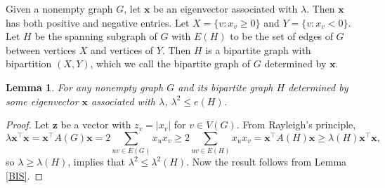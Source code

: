 \documentclass[12pt]{article}
\newtheorem{lemma}{Lemma}[section]
\begin{document}
Given a nonempty graph $G$, let $\mathbf{x}$ be an eigenvector associated with $\lambda$. %
Then $\mathbf{x}$ has both positive and negative entries. Let $X = \{v : x_v \ge 0\}$ and $Y = \{v : x_v < 0\}$. Let $H$ be the spanning subgraph of $G$ with $E(H)$ to be the set of edges of $G$ between vertices $X$ and vertices of $Y$. Then $H$ is a bipartite graph with bipartition $(X, Y)$, which we call the bipartite graph of $G$ determined by $\mathbf{x}$.



\begin{lemma}\label{maxcut}
For any nonempty graph $G$ and its  bipartite graph $H$ determined by some eigenvector  $\mathbf{x}$ associated with $\lambda$, $\lambda^2 \le e(H)$.
\end{lemma}

\begin{proof}
Let $\mathbf{z}$ be a vector with  $z_v = |x_v|$ for $v\in V(G)$. From Rayleigh's principle,
\[
\lambda \mathbf{x}^\top\mathbf{x}=\mathbf{x}^\top A(G)\mathbf{x}=2\sum_{uv\in E(G)}x_ux_v\ge 2\sum_{uv\in E(H)}x_ux_v=\mathbf{x}^\top A(H)\mathbf{x}\ge \lambda(H)\mathbf{x}^\top\mathbf{x},
\]
so $\lambda\ge \lambda(H)$, implies that $\lambda^2\le \lambda^2(H)$. Now the result follows from Lemma \ref{BIS}.
\end{proof}
\end{document}
